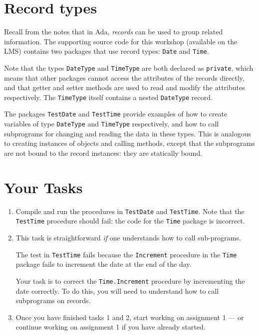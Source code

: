 \documentclass{article}
\begin{document}
\section*{Record types}

Recall from the notes that in Ada, \emph{records} can be used to group related information. The supporting source code for this workshop (available on the LMS) contains two packages that use record types: \texttt{Date} and \texttt{Time}.

Note that the types \texttt{DateType} and \texttt{TimeType} are both declared as \texttt{private}, which means that other packages cannot access the attributes of the records directly, and that getter and setter methods are used to read and modify the attributes respectively. The \texttt{TimeType} itself contains a nested \texttt{DateType} record.

The packages \texttt{TestDate} and \texttt{TestTime} provide examples of how to create variables of type \texttt{DateType} and \texttt{TimeType} respectively, and how to call subprograms for changing and reading the data in these types. This is analogous to creating instances of objects and calling methods, except that the subprograms are not bound to the record instances: they are statically bound.

\section*{Your Tasks}

\begin{enumerate}

\item Compile and run the procedures in \texttt{TestDate} and \texttt{TestTime}. Note that the \texttt{TestTime} procedure should fail: the code for the \texttt{Time} package is incorrect.

\item This task is straightforward \emph{if} one understands how to call sub-programs.

The test in \texttt{TestTime} fails because the \texttt{Increment} procedure in the \texttt{Time} package fails to increment the date at the end of the day.

Your task is to correct the \texttt{Time.Increment} procedure by incrementing the date correctly. To do this, you will need to understand how to call subprograms on records. 

\item Once you have finished tasks 1 and 2, start working on assignment 1 --- or continue working on assignment 1 if you have already started. 

\end{enumerate}
\end{document}
